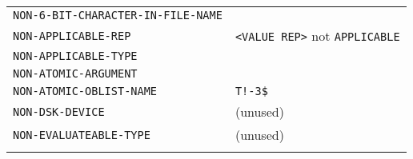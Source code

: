 \documentclass[a4paper,]{article}
\begin{document}
\begin{longtable}[]{@{}ll@{}}
\begin{minipage}[t]{0.58\columnwidth}
\texttt{NON-6-BIT-CHARACTER-IN-FILE-NAME}\strut
\end{minipage} & \begin{minipage}[t]{0.36\columnwidth}\raggedright\strut
\strut
\end{minipage}\tabularnewline
\begin{minipage}[t]{0.58\columnwidth}\raggedright\strut
\texttt{NON-APPLICABLE-REP}\strut
\end{minipage} & \begin{minipage}[t]{0.36\columnwidth}\raggedright\strut
\texttt{\textless{}VALUE\ REP\textgreater{}} not \texttt{APPLICABLE}\strut
\end{minipage}\tabularnewline
\begin{minipage}[t]{0.58\columnwidth}\raggedright\strut
\texttt{NON-APPLICABLE-TYPE}\strut
\end{minipage} & \begin{minipage}[t]{0.36\columnwidth}\raggedright\strut
\strut
\end{minipage}\tabularnewline
\begin{minipage}[t]{0.58\columnwidth}\raggedright\strut
\texttt{NON-ATOMIC-ARGUMENT}\strut
\end{minipage} & \begin{minipage}[t]{0.36\columnwidth}\raggedright\strut
\strut
\end{minipage}\tabularnewline
\begin{minipage}[t]{0.58\columnwidth}\raggedright\strut
\texttt{NON-ATOMIC-OBLIST-NAME}\strut
\end{minipage} & \begin{minipage}[t]{0.36\columnwidth}\raggedright\strut
\texttt{T!-3\$}\strut
\end{minipage}\tabularnewline
\begin{minipage}[t]{0.58\columnwidth}\raggedright\strut
\texttt{NON-DSK-DEVICE}\strut
\end{minipage} & \begin{minipage}[t]{0.36\columnwidth}\raggedright\strut
(unused)\strut
\end{minipage}\tabularnewline
\begin{minipage}[t]{0.58\columnwidth}\raggedright\strut
\texttt{NON-EVALUATEABLE-TYPE}\strut
\end{minipage} & \begin{minipage}[t]{0.36\columnwidth}\raggedright\strut
(unused)\strut
\end{minipage}\tabularnewline
\begin{minipage}[t]{0.58\columnwidth}\raggedright\strut

\end{minipage}
\end{longtable}
\end{document}
